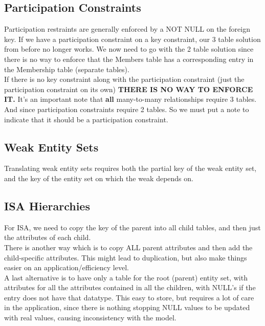 \documentclass[12pt]{article}
\theoremstyle{definition}
\begin{document}
\subsection{Participation Constraints}
Participation restraints are generally enforced by a NOT NULL on the foreign key. If we have a participation constraint on a key constraint, our 3 table solution from before no longer works. We now need to go with the 2 table solution since there is no way to enforce that the Members table has a corresponding entry in the Membership table (separate tables).
\\ \linebreak
If there is no key constraint along with the participation constraint (just the participation constraint on its own)\textbf{ THERE IS NO WAY TO ENFORCE IT.} It's an important note that \textbf{all} many-to-many relationships require 3 tables. And since participation constraints require 2 tables. So we must put a note to indicate that it should be a participation constraint.
\\ \linebreak

\subsection{Weak Entity Sets}
Translating weak entity sets requires both the partial key of the weak entity set, and the key of the entity set on which the weak depends on. 

\subsection{ISA Hierarchies}
For ISA, we need to copy the key of the parent into all child tables, and then just the attributes of each child.
\\ \linebreak
There is another way which is to copy ALL parent attributes and then add the child-specific attributes. This might lead to duplication, but also make things easier on an application/efficiency level.
\\ \linebreak
A last alternative is to have only a table for the root (parent) entity set, with attributes for all the attributes contained in all the children, with NULL's if the entry does not have that datatype. This easy to store, but requires a lot of care in the application, since there is nothing stopping NULL values to be updated with real values, causing inconsistency with the model. 
\\ \linebreak
\end{document}

